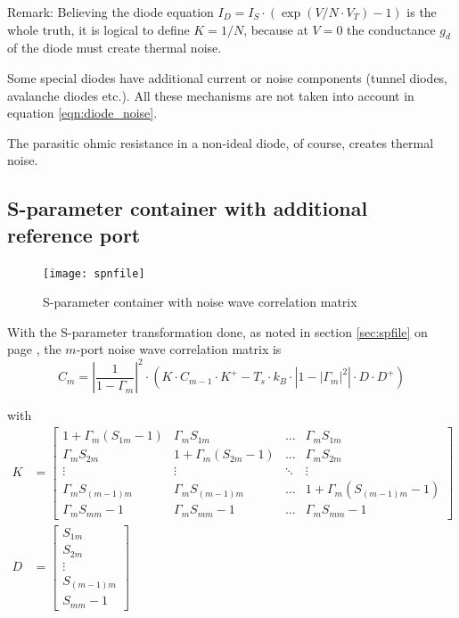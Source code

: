 \documentclass[10pt]{report}
\begin{document}
Remark: Believing the diode equation $I_D = I_S\cdot (\exp(V/N\cdot
V_T) - 1)$ is the whole truth, it is logical to define $K=1/N$,
because at $V=0$ the conductance $g_d$ of the diode must create
thermal noise.

\addvspace{12pt}

Some special diodes have additional current or noise components
(tunnel diodes, avalanche diodes etc.).  All these mechanisms are not
taken into account in equation \eqref{eqn:diode_noise}.

\addvspace{12pt}

The parasitic ohmic resistance in a non-ideal diode, of course,
creates thermal noise.

\subsection{S-parameter container with additional reference port}

\begin{figure}[ht]
\begin{center}
\texttt{[image: spnfile]}
\end{center}
\caption{S-parameter container with noise wave correlation matrix}
\label{fig:spnfile}
\end{figure}
\FloatBarrier

With the S-parameter transformation done, as noted in section
\ref{sec:spfile} on page \pageref{sec:spfile}, the $m$-port noise wave
correlation matrix is
\begin{equation}
C_m = \left|\dfrac{1}{1 - \Gamma_m}\right|^2 \cdot \left(K\cdot C_{m-1}\cdot K^+ -T_s\cdot k_B \cdot\left|1 - \left|\Gamma_m\right|^2\right|\cdot D\cdot D^+\right)
\end{equation}

with
\begin{align}
K &=
\begin{bmatrix}
1 + \Gamma_m\left(S_{1m} -1\right) & \Gamma_m S_{1m} & \ldots & \Gamma_m S_{1m}\\
\Gamma_m S_{2m} & 1 + \Gamma_m\left(S_{2m} -1\right) & \ldots & \Gamma_m S_{2m}\\
\vdots & \vdots & \ddots & \vdots\\
\Gamma_m S_{(m-1)m} & \Gamma_m S_{(m-1)m} & \ldots & 1 + \Gamma_m\left(S_{(m-1)m} -1\right)\\
\Gamma_m S_{mm} - 1 & \Gamma_m S_{mm} - 1 & \ldots & \Gamma_m S_{mm} - 1
\end{bmatrix}\\
D &=
\begin{bmatrix}
S_{1m}\\
S_{2m}\\
\vdots\\
S_{(m-1)m}\\
S_{mm} - 1
\end{bmatrix}
\end{align}
\end{document}
